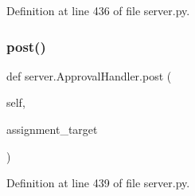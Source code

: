 Definition at line 436 of file server.\+py.

\mbox{\label{classserver_1_1ApprovalHandler_ac4bf954a99f21508d776129b209b1488}} 
\subsubsection{\texorpdfstring{post()}{post()}}
{\footnotesize\ttfamily def server.\+Approval\+Handler.\+post (\begin{DoxyParamCaption}\item[{}]{self,  }\item[{}]{assignment\+\_\+target }\end{DoxyParamCaption})}



Definition at line 439 of file server.\+py.



